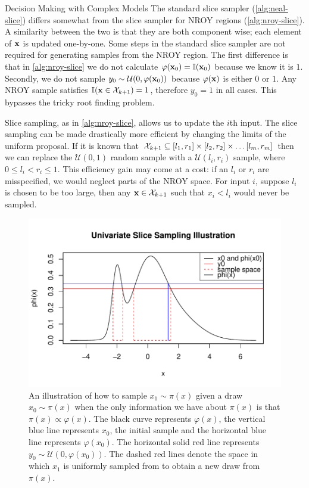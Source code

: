 \begin{chapter}{Decision Making with Complex Models \label{Chap:optimisation}}
The standard slice sampler (\cref{alg:neal-slice}) differs somewhat from the slice sampler for NROY regions (\cref{alg:nroy-slice}). A similarity between the two is that they are both component wise; each element of $\mathbf{x}$ is updated one-by-one. Some steps in the standard slice sampler are not required for generating samples from the NROY region. The first difference is that in \cref{alg:nroy-slice} we do not calculate $\varphi(\mathbf{x}_0) = \mathbb{I}(\mathbf{x}_0)$ because we know it is $1$. Secondly, we do not sample $y_0 \sim \mathcal{U}(0, \varphi(\mathbf{x}_0))$ because $\varphi(\mathbf{x})$ is either $0$ or $1$. Any NROY sample satisfies $\mathbb{I}(\mathbf{x} \in \mathcal{X}_{k+1}) = 1$, therefore $y_0=1$ in all cases. This bypasses the tricky root finding problem.

Slice sampling, as in \cref{alg:nroy-slice}, allows us to update the $i$th input. The slice sampling can be made drastically more efficient by changing the limits of the uniform proposal. If it is known that $\mathcal{X}_{k+1} \subseteq [l_1, r_1] \times [l_2, r_2] \times \ldots [l_m, r_m]$ then we can replace the $\mathcal{U}(0,1)$ random sample with a $\mathcal{U}(l_i, r_i)$ sample, where $0 \leq l_i < r_i \leq 1$. This efficiency gain may come at a cost: if an $l_i$ or $r_i$ are misspecified, we would neglect parts of the NROY space. For input $i$, suppose $l_i$ is chosen to be too large, then any $\mathbf{x} \in \mathcal{X}_{k+1}$ such that $x_i < l_i$ would never be sampled.
\begin{figure}[h]
 \centering
 \includegraphics{fig-optim/slice-diagram.pdf}
 \caption{An illustration of how to sample $x_1 \sim \pi(x)$ given a draw $x_0 \sim \pi(x)$ when the only information we have about $\pi(x)$ is that $\pi(x) \propto \varphi(x)$. The black curve represents $\varphi(x)$, the vertical blue line represents $x_0$, the initial sample and the horizontal blue line represents $\varphi(x_0)$. The horizontal solid red line represents $y_0 \sim \mathcal{U}(0, \varphi(x_0))$. The dashed red lines denote the space in which $x_1$ is uniformly sampled from to obtain a new draw from $\pi(x)$.\label{Fig:slice-diagram}}

\end{figure}
\end{chapter}
